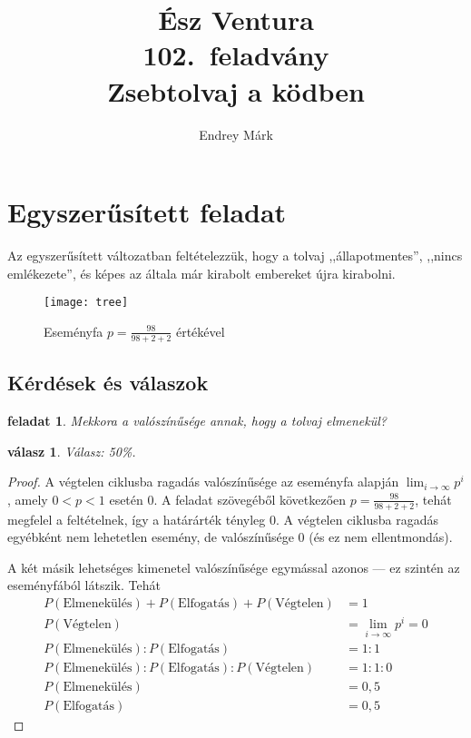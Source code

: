 \documentclass{article}
\author{Endrey Márk}
\title{Ész Ventura\\102.~feladvány\\Zsebtolvaj a ködben}
\newtheorem{task}{feladat}
\newtheorem{answer}{válasz}
\newcommand{\parenthesed}[1]{\left(#1\right)}
\begin{document}
	\maketitle

	\tableofcontents

	\section{Egyszerűsített feladat}

	Az egyszerűsített változatban feltételezzük, hogy a tolvaj ,,állapotmentes'', ,,nincs emlékezete'', és képes az általa már kirabolt embereket újra kirabolni.

	\begin{figure}[H]
		\caption*{Eseményfa $p = \frac{98}{98+2+2}$ értékével}
		\centering
		\texttt{[image: tree]}
	\end{figure}

	\subsection{Kérdések és válaszok}

	\begin{task}
		Mekkora a valószínűsége annak, hogy a tolvaj elmenekül?
	\end{task}

	\begin{answer}
		Válasz: 50\%.
	\end{answer}

	\begin{proof}
		A végtelen ciklusba ragadás valószínűsége az eseményfa alapján $\lim_{i\to\infty}p^i$, amely $0 < p < 1$ esetén $0$.
		A feladat szövegéből következően $p = \frac{98}{98+2+2}$, tehát megfelel a feltételnek, így a határárték tényleg 0.
		A végtelen ciklusba ragadás egyébként nem lehetetlen esemény, de valószínűsége 0 (és ez nem ellentmondás).

		A két másik lehetséges kimenetel valószínűsége egymással azonos --- ez szintén az eseményfából látszik.
		Tehát
		\begin{align}
			P\parenthesed{\text{Elmenekülés}} + P\parenthesed{\text{Elfogatás}} + P\parenthesed{\text{Végtelen}} &= 1\\
			P\parenthesed{\text{Végtelen}} &= \lim_{i\to\infty}p^i = 0\\
			P\parenthesed{\text{Elmenekülés}} : P\parenthesed{\text{Elfogatás}} &= 1 : 1\\
			P\parenthesed{\text{Elmenekülés}} : P\parenthesed{\text{Elfogatás}} : P\parenthesed{\text{Végtelen}} &= 1 : 1 : 0\\
			P\parenthesed{\text{Elmenekülés}} &= 0,5\\
			P\parenthesed{\text{Elfogatás}} &= 0,5
		\end{align}
	\end{proof}
\end{document}
